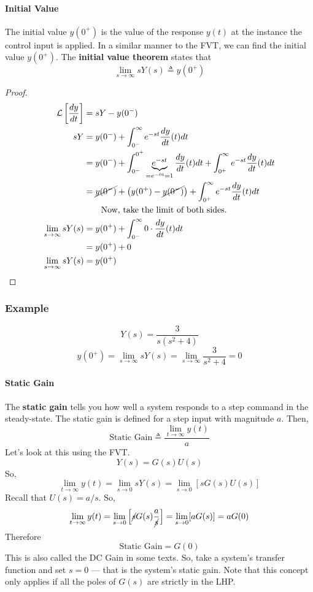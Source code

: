 \documentclass{book}
\newcommand{\LT}{\mathcal{L}}
\newcommand{\exmp}{\subsubsection*{Example}}
\begin{document}
\paragraph*{Initial Value} The initial value $ y(0^+) $ is the value of the response $ y(t) $ at the instance the control input is applied. In a similar manner to the FVT, we can find the initial value $ y(0^+) $. The \textbf{initial value theorem} states that
\[ 	\lim\limits_{s\to\infty}sY(s) \triangleq y(0^+) \]
\begin{proof}
	\begin{align*}
	\LT\left[\frac{dy}{dt}\right] &= sY-y(0^-)\\
	sY &=y(0^-) + \int_{0^-}^{\infty}e^{-st}\frac{dy}{dt}(t)dt\\
	&=y(0^-) + \int_{0^-}^{0^+} \underbrace{e^{-st}}_{=e^{-0t}=1} \frac{dy}{dt}(t)dt + \int_{0^+}^{\infty} e^{-st} \frac{dy}{dt}(t)dt\\
	&=\cancel{y(0^-)} + \big(y(0^+) - \cancel{y(0^-)}\big)+ \int_{0^+}^{\infty}e^{-st}\frac{dy}{dt}(t)dt\\
	&\qquad \text{Now, take the limit of both sides.}\\
	\lim\limits_{s\to\infty}sY(s)&= y(0^+) + \int_{0^-}^{\infty}0\cdot\frac{dy}{dt}(t)dt\\
	&=y(0^+) + 0\\
	\lim\limits_{s\to\infty}sY(s)&=y(0^+)
	\end{align*}
\end{proof}

\exmp
\[ Y(s) = \frac{3}{s(s^2+4)} \]
\[ y(0^+) = \lim_{s\to\infty} sY(s) = \lim_{s\to\infty} \frac{3}{s^2+4} = 0 \]

\paragraph*{Static Gain} The \textbf{static gain} tells you how well a system responds to a step command in the steady-state. The static gain is defined for a step input with magnitude $ a $. Then,
\[ \text{Static Gain}\triangleq \frac{\lim_{t\to\infty}y(t)}{a} \]
Let's look at this using the FVT.
\[ Y(s) = G(s)U(s) \]
So,
\[ \lim_{t\to\infty}y(t) = \lim_{s\to0} sY(s) = \lim_{s\to0} [sG(s)U(s)] \] 
Recall that $ U(s)=a/s $. So,
\[ \lim_{t\to\infty}y(t) = \lim_{s\to0} \left[\cancel{s}G(s)\frac{a}{\cancel{s}}\right] = \lim_{s\to0}[aG(s)] = a G(0) \]
Therefore
\[ \text{Static Gain} = G(0) \]
This is also called the DC Gain in some texts. So, take a system's transfer function and set $ s=0 $ --- that is the system's static gain. Note that this concept only applies if all the poles of $ G(s) $ are strictly in the LHP.
\end{document}
